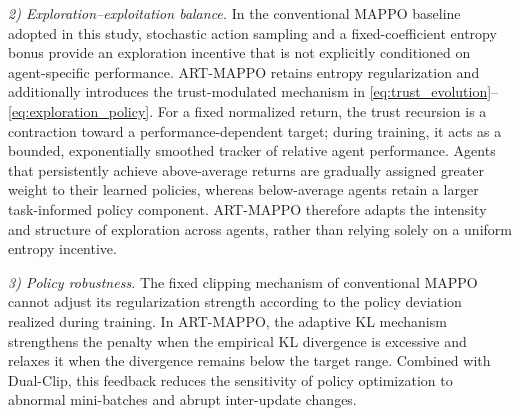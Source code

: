 \documentclass[lettersize,journal]{IEEEtran}
\begin{document}

\emph{2) Exploration--exploitation balance.}
In the conventional MAPPO baseline adopted in this study, stochastic action
sampling and a fixed-coefficient entropy bonus provide an exploration incentive
that is not explicitly conditioned on agent-specific performance. ART-MAPPO
retains entropy regularization and additionally introduces the trust-modulated
mechanism in \eqref{eq:trust_evolution}--\eqref{eq:exploration_policy}. For a
fixed normalized return, the trust recursion is a contraction toward a
performance-dependent target; during training, it acts as a bounded,
exponentially smoothed tracker of relative agent performance. Agents that
persistently achieve above-average returns are gradually assigned greater
weight to their learned policies, whereas below-average agents retain a larger
task-informed policy component. ART-MAPPO therefore adapts the intensity and
structure of exploration across agents, rather than relying solely on a uniform
entropy incentive. 

\emph{3) Policy robustness.}
The fixed clipping mechanism of conventional MAPPO cannot adjust its
regularization strength according to the policy deviation realized during
training. In ART-MAPPO, the adaptive KL mechanism strengthens the penalty when
the empirical KL divergence is excessive and relaxes it when the divergence
remains below the target range. Combined with Dual-Clip, this feedback reduces
the sensitivity of policy optimization to abnormal mini-batches and abrupt
inter-update changes. 

\end{document}
